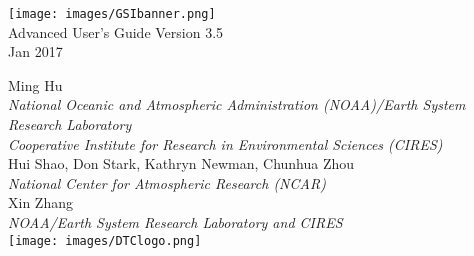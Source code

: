 \begin{titlepage}
{}
\noindent
   \begin{center}     

      \texttt{[image: images/GSIbanner.png]}\\[2em]
     {\color{darkcerulean}
        \Huge{Advanced User's Guide Version 3.5 }\\[1em]       
        \normalsize{Jan 2017}\\[5em] 
       }
 
      \normalsize{Ming Hu}\\ 
      \textit{\small{National Oceanic and Atmospheric Administration (NOAA)/Earth System Research Laboratory}}\\
      \textit{\small{Cooperative Institute for Research in Environmental Sciences (CIRES)}}\\[2em]
      \normalsize{Hui Shao, Don Stark, Kathryn Newman, Chunhua Zhou}\\
      \textit{\small{National Center for Atmospheric Research (NCAR)}}\\[2em]
      \normalsize{Xin Zhang}\\
      \textit{\small{NOAA/Earth System Research Laboratory and CIRES}}\\[4em]
    
       \texttt{[image: images/DTClogo.png]}\\
         
      \vspace{1em}

   \end{center}
   \restoregeometry
\end{titlepage}
\pagebreak{}





